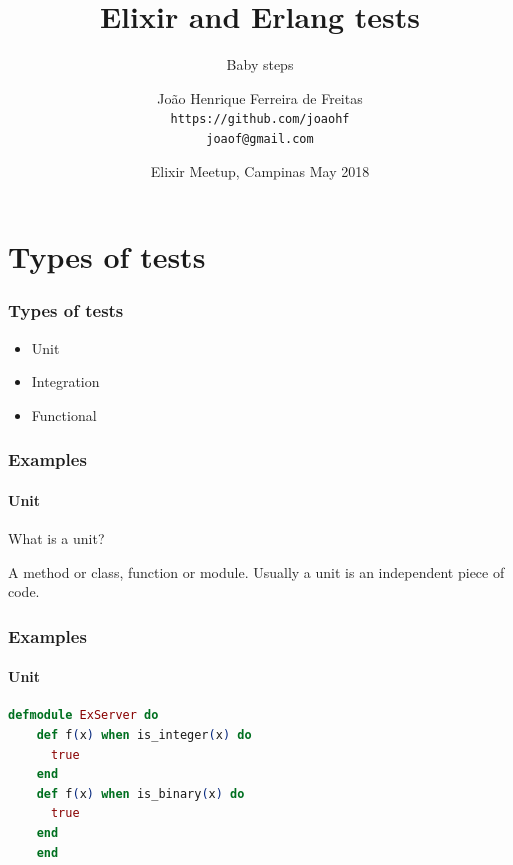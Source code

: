 \documentclass{beamer}
\title{Elixir and Erlang tests}
\subtitle{Baby steps}
\author[joaohf]{João Henrique Ferreira de Freitas \\ \texttt{https://github.com/joaohf} \\ \texttt{joaof@gmail.com}}
\date[EMC May 2018]{Elixir Meetup, Campinas May 2018}
\begin{document}
  \begin{frame}
    \titlepage
  \end{frame}

  \section[Section]{Types of tests}
  
  \begin{frame}
    \frametitle{Types of tests}   
    \begin{itemize}[<+->]
      \item Unit
      \item Integration
      \item Functional    
    \end{itemize}
  \end{frame}
  
  \begin{frame}
    \frametitle{Examples}
    \framesubtitle{Unit}

    \begin{block}{}      
    What is a unit? \pause
    \end{block}
    
    \begin{alertblock}{}
    A method or class, function or module. Usually a unit is an independent piece of code.
    \end{alertblock}
    
  \end{frame}
  
  \begin{frame}[fragile]
    \frametitle{Examples}
    \framesubtitle{Unit}
    
    \begin{lstlisting}[language=elixir]
    defmodule ExServer do
    def f(x) when is_integer(x) do  
      true
    end
    def f(x) when is_binary(x) do
      true
    end
    end
    \end{lstlisting}
  \end{frame}
  
\end{document}
